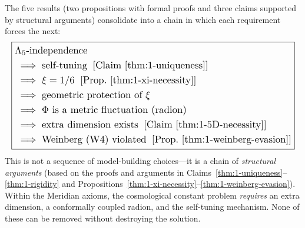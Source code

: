 The five results (two propositions with formal proofs and three claims supported by structural arguments) consolidate into a chain in which each requirement forces the next:
\begin{equation}
\label{eq:1-necessity-chain}
\resizebox{\columnwidth}{!}{$\displaystyle\boxed{
\begin{aligned}
&\Lambda_5\text{-independence} \\
&\;\Longrightarrow\; \text{self-tuning}\;\; [\text{Claim~\ref{thm:1-uniqueness}}] \\
&\;\Longrightarrow\; \xi = 1/6\;\; [\text{Prop.~\ref{thm:1-xi-necessity}}] \\
&\;\Longrightarrow\; \text{geometric protection of } \xi \\
&\;\Longrightarrow\; \Phi \text{ is a metric fluctuation (radion)} \\
&\;\Longrightarrow\; \text{extra dimension exists}\;\; [\text{Claim~\ref{thm:1-5D-necessity}}] \\
&\;\Longrightarrow\; \text{Weinberg (W4) violated}\;\; [\text{Prop.~\ref{thm:1-weinberg-evasion}}]
\end{aligned}
}$}
\end{equation}
This is not a sequence of model-building choices---it is a chain of \emph{structural arguments} (based on the proofs and arguments in Claims~\ref{thm:1-uniqueness}--\ref{thm:1-rigidity} and Propositions~\ref{thm:1-xi-necessity}--\ref{thm:1-weinberg-evasion}). Within the Meridian axioms, the cosmological constant problem \emph{requires} an extra dimension, a conformally coupled radion, and the self-tuning mechanism. None of these can be removed without destroying the solution.

